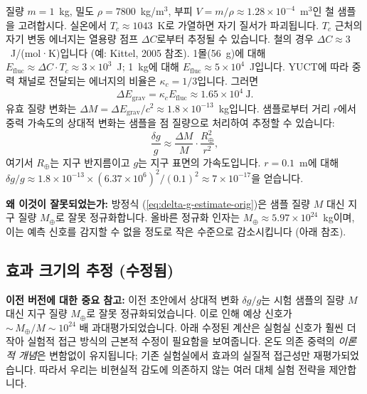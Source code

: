 \documentclass[11pt,a4paper]{article}
\begin{document}
	질량 $m = 1$~kg, 밀도 $\rho = 7800$~kg/m$^3$, 부피 $V = m/\rho \approx 1.28\times10^{-4}$~m$^3$인 철 샘플을 고려합시다. 실온에서 $T_c \approx 1043$~K로 가열하면 자기 질서가 파괴됩니다. $T_c$ 근처의 자기 변동 에너지는 열용량 점프 $\Delta C$로부터 추정될 수 있습니다. 철의 경우 $\Delta C \approx 3$~J/(mol·K)입니다 (예: Kittel, 2005 참조). 1몰(56~g)에 대해 $E_{\text{fluc}} \approx \Delta C \cdot T_c \approx 3\times10^3$~J; 1~kg에 대해 $E_{\text{fluc}} \approx 5\times10^4$~J입니다. YUCT에 따라 중력 채널로 전달되는 에너지의 비율은 $\kappa_c = 1/3$입니다. 그러면
	\begin{equation}
		\Delta E_{\text{grav}} = \kappa_c E_{\text{fluc}} \approx 1.65\times10^4\ \text{J}.
	\end{equation}
	유효 질량 변화는 $\Delta M = \Delta E_{\text{grav}} / c^2 \approx 1.8\times10^{-13}$~kg입니다. 샘플로부터 거리 $r$에서 중력 가속도의 상대적 변화는 샘플을 점 질량으로 처리하여 추정할 수 있습니다:
	\begin{equation}
		\frac{\delta g}{g} \approx \frac{\Delta M}{M} \cdot \frac{R_\oplus^2}{r^2},
		\label{eq:delta-g-estimate-orig}
	\end{equation}
	여기서 $R_\oplus$는 지구 반지름이고 $g$는 지구 표면의 가속도입니다. $r = 0.1$~m에 대해 $\delta g/g \approx 1.8\times10^{-13} \times (6.37\times10^6)^2 / (0.1)^2 \approx 7\times10^{-17}$을 얻습니다.
	
	\textbf{왜 이것이 잘못되었는가:} 방정식 (\ref{eq:delta-g-estimate-orig})은 샘플 질량 $M$ 대신 지구 질량 $M_\oplus$로 잘못 정규화합니다. 올바른 정규화 인자는 $M_\oplus \approx 5.97\times10^{24}$~kg이며, 이는 예측 신호를 감지할 수 없을 정도로 작은 수준으로 감소시킵니다 (아래 참조).
	
	\subsection{효과 크기의 추정 (수정됨)}
	\label{subsec:lab-estimate-corrected}
	
	\textbf{이전 버전에 대한 중요 참고:} 이전 초안에서 상대적 변화 $\delta g/g$는 시험 샘플의 질량 $M$ 대신 지구 질량 $M_\oplus$로 잘못 정규화되었습니다. 이로 인해 예상 신호가 ${\sim}\, M_\oplus/M \sim 10^{24}$ 배 과대평가되었습니다. 아래 수정된 계산은 실험실 신호가 훨씬 더 작아 실험적 접근 방식의 근본적 수정이 필요함을 보여줍니다. 온도 의존 중력의 \emph{이론적 개념}은 변함없이 유지됩니다; 기존 실험실에서 효과의 실질적 접근성만 재평가되었습니다. 따라서 우리는 비현실적 감도에 의존하지 않는 여러 대체 실험 전략을 제안합니다.
	
\end{document}
